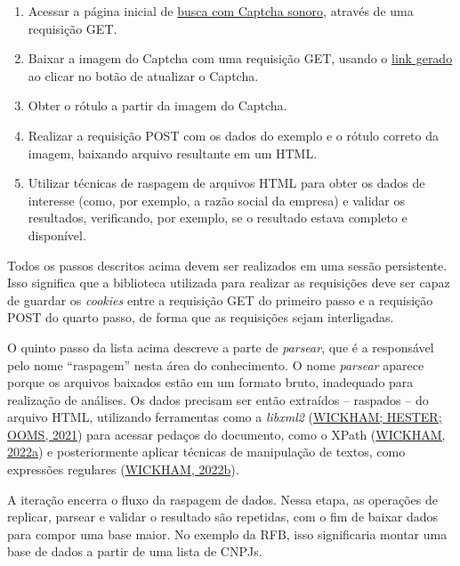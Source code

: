 \documentclass[12pt,twoside,brazilian]{book}
\providecommand{\tightlist}{%
  \setlength{\itemsep}{0pt}\setlength{\parskip}{0pt}}
\begin{document}
\begin{enumerate}
\def\labelenumi{\arabic{enumi}.}
\tightlist
\item
  Acessar a página inicial de
  \href{http://servicos.receita.fazenda.gov.br/Servicos/cnpjreva/Cnpjreva_Solicitacao_CS.asp}{busca
  com Captcha sonoro}, através de uma requisição GET.
\item
  Baixar a imagem do Captcha com uma requisição GET, usando o
  \href{http://servicos.receita.fazenda.gov.br/Servicos/cnpjreva/captcha/gerarCaptcha.asp}{link
  gerado} ao clicar no botão de atualizar o Captcha.
\item
  Obter o rótulo a partir da imagem do Captcha.
\item
  Realizar a requisição POST com os dados do exemplo e o rótulo correto
  da imagem, baixando arquivo resultante em um HTML.
\item
  Utilizar técnicas de raspagem de arquivos HTML para obter os dados de
  interesse (como, por exemplo, a razão social da empresa) e validar os
  resultados, verificando, por exemplo, se o resultado estava completo e
  disponível.
\end{enumerate}

Todos os passos descritos acima devem ser realizados em uma sessão
persistente. Isso significa que a biblioteca utilizada para realizar as
requisições deve ser capaz de guardar os \emph{cookies} entre a
requisição GET do primeiro passo e a requisição POST do quarto passo, de
forma que as requisições sejam interligadas.

O quinto passo da lista acima descreve a parte de \emph{parsear}, que é
a responsável pelo nome ``raspagem'' nesta área do conhecimento. O nome
\emph{parsear} aparece porque os arquivos baixados estão em um formato
bruto, inadequado para realização de análises. Os dados precisam ser
então extraídos -- raspados -- do arquivo HTML, utilizando ferramentas
como a \emph{libxml2} (\protect\hyperlink{ref-xml2}{WICKHAM; HESTER;
OOMS, 2021}) para acessar pedaços do documento, como o XPath
(\protect\hyperlink{ref-rvest}{WICKHAM, 2022a}) e posteriormente aplicar
técnicas de manipulação de textos, como expressões regulares
(\protect\hyperlink{ref-stringr}{WICKHAM, 2022b}).

A iteração encerra o fluxo da raspagem de dados. Nessa etapa, as
operações de replicar, parsear e validar o resultado são repetidas, com
o fim de baixar dados para compor uma base maior. No exemplo da RFB,
isso significaria montar uma base de dados a partir de uma lista de
CNPJs.
\end{document}
